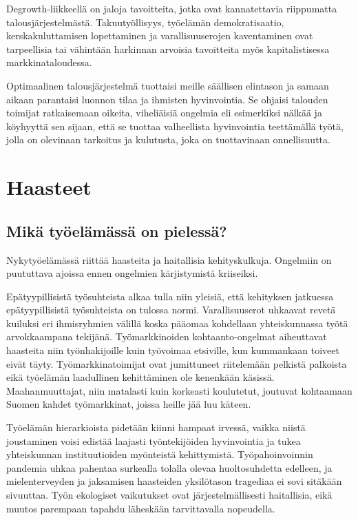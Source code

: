 \documentclass[nobib,finnish,oneside,openany,notoc,a4paper]{tufte-book}
\begin{document}
Degrowth-liikkeellä on jaloja tavoitteita, jotka ovat kannatettavia
riippumatta talousjärjestelmästä.  Takuutyöllisyys, työelämän
demokratisaatio, kerskakuluttamisen lopettaminen ja varallisuuserojen
kaventaminen ovat tarpeellisia tai vähintään harkinnan arvoisia
tavoitteita myös kapitalistisessa markkinataloudessa.

Optimaalinen talousjärjestelmä tuottaisi meille säällisen elintason ja
samaan aikaan parantaisi luonnon tilaa ja ihmisten hyvinvointia. Se
ohjaisi talouden toimijat ratkaisemaan oikeita, viheliäisiä ongelmia eli
esimerkiksi nälkää ja köyhyyttä sen sijaan, että se tuottaa valheellista
hyvinvointia teettämällä työtä, jolla on olevinaan tarkoitus ja
kulutusta, joka on tuottavinaan onnellisuutta.

\part{Haasteet}

\chapter{Mikä työelämässä on pielessä?}

Nykytyöelämässä riittää haasteita ja haitallisia kehityskulkuja.
Ongelmiin on puututtava ajoissa ennen ongelmien kärjistymistä
kriiseiksi.

Epätyypillisistä työsuhteista alkaa tulla niin yleisiä, että
kehityksen jatkuessa epätyypillisistä työsuhteista on tulossa normi.
Varallisuuserot uhkaavat revetä kuiluksi eri ihmisryhmien
välillä koska pääomaa kohdellaan yhteiskunnassa työtä arvokkaampana
tekijänä. Työmarkkinoiden kohtaanto-ongelmat aiheuttavat haasteita niin
työnhakijoille kuin työvoimaa etsiville, kun kummankaan toiveet eivät
täyty. Työmarkkinatoimijat ovat
jumittuneet riitelemään pelkistä palkoista eikä työelämän laadullinen
kehittäminen ole kenenkään käsissä. Maahanmuuttajat, niin matalasti kuin
korkeasti koulutetut, joutuvat kohtaamaan Suomen kahdet työmarkkinat,
joissa heille jää luu käteen.

Työelämän hierarkioista pidetään kiinni hampaat irvessä, vaikka
niistä joustaminen voisi edistää laajasti työntekijöiden hyvinvointia ja
tukea yhteiskunnan instituutioiden myönteistä kehittymistä.
Työpahoinvoinnin pandemia uhkaa pahentaa surkealla tolalla olevaa
huoltosuhdetta edelleen, ja mielenterveyden ja jaksamisen haasteiden
yksilötason tragediaa ei sovi sitäkään sivuuttaa. Työn ekologiset
vaikutukset ovat järjestelmällisesti haitallisia, eikä muutos parempaan
tapahdu läheskään tarvittavalla nopeudella. 
\end{document}
